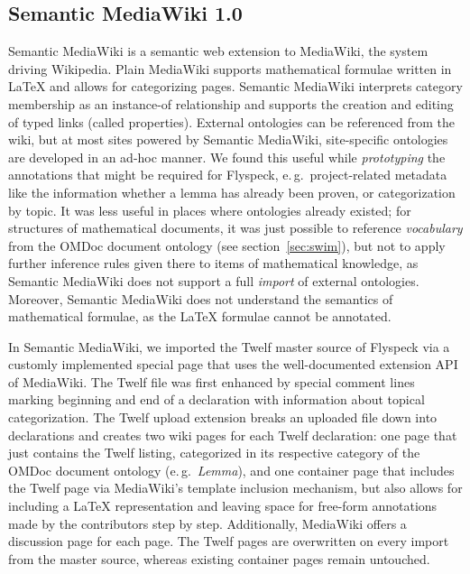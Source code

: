 \subsection{Semantic MediaWiki 1.0}
\label{sec:smw-study}

Semantic MediaWiki\cite{KrSchVr:semwiki-reasoning07} is a semantic web extension
to MediaWiki, the system driving Wikipedia.  Plain MediaWiki supports
mathematical formulae written in {\LaTeX} and allows for categorizing pages.
Semantic MediaWiki interprets category membership as an instance-of relationship
and supports the creation and editing of typed links (called properties).  
External ontologies can be referenced from the wiki, but at most
\ednote{}
sites powered by Semantic MediaWiki, site-specific ontologies are developed in
an ad-hoc manner.  We found this useful while \emph{prototyping} the annotations
that might be required for Flyspeck, e.\,g.\ project-related metadata like the
information whether a lemma has already been proven, or categorization by topic.
It was less useful in places where ontologies already existed; for structures of
mathematical documents, it was just possible to reference \emph{vocabulary} from
the OMDoc document ontology (see section~\ref{sec:swim}), but not to apply
further inference rules given there to items of mathematical knowledge, as
Semantic MediaWiki does not support a full \emph{import} of external ontologies.
Moreover, Semantic MediaWiki does not understand the semantics of mathematical
formulae, as the {\LaTeX} formulae cannot be annotated.

In Semantic MediaWiki, we imported the Twelf master source of Flyspeck via a
customly implemented special page that uses the well-documented extension API of
MediaWiki.  The Twelf file was first enhanced by special comment lines marking
beginning and end of a declaration with information about topical categorization.
The Twelf upload extension breaks an uploaded file down into declarations and
creates two wiki pages for each Twelf declaration: one page that just contains
the Twelf listing, categorized in its respective category of the OMDoc document
ontology (e.\,g.\ \textit{Lemma}), and one container page that includes the
Twelf page via MediaWiki's template inclusion mechanism, but also allows for
including a {\LaTeX} representation and leaving space for free-form annotations
made by the contributors step by step.  Additionally, MediaWiki offers a
discussion page for each page.  The Twelf pages are overwritten on every import
from the master source, whereas existing container pages remain untouched.

